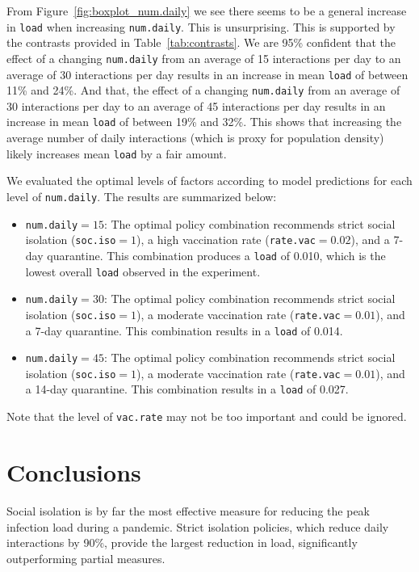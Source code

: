\documentclass[12pt,a4paper]{article}
\begin{document}
From Figure~\ref{fig:boxplot_num.daily} we see there seems to be a general increase in \verb`load` when increasing  \verb`num.daily`. This is unsurprising. This is supported by the contrasts provided in Table~\ref{tab:contrasts}. We are 95\% confident that the effect of a changing \verb`num.daily` from an average of 15 interactions per day to an average of 30 interactions per day results in an increase in mean \verb`load` of between 11\% and 24\%. And that, the effect of a changing \verb`num.daily` from an average of 30 interactions per day to an average of 45 interactions per day results in an increase in mean \verb`load` of between 19\% and 32\%. This shows that increasing the average number of daily interactions (which is proxy for population density) likely increases mean \verb`load` by a fair amount.

We evaluated the optimal levels of factors according to model predictions for each level of \verb`num.daily`. The results are summarized below:
\begin{itemize}
	\item \verb`num.daily`$=15$: The optimal policy combination recommends strict social isolation (\verb'soc.iso'$=1$), a high vaccination rate (\verb'rate.vac'$=0.02$), and a 7-day quarantine. This combination produces a \verb`load` of 0.010, which is the lowest overall \verb`load` observed in the experiment.
	\item \verb`num.daily`$=30$: The optimal policy combination recommends strict social isolation (\verb`soc.iso`$=1$), a moderate vaccination rate (\verb`rate.vac`$= 0.01$), and a 7-day quarantine. This combination results in a \verb`load` of 0.014.
	\item \verb`num.daily`$= 45$: The optimal policy combination recommends strict social isolation (\verb`soc.iso`$= 1$), a moderate vaccination rate (\verb`rate.vac`$=0.01$), and a 14-day quarantine. This combination results in a \verb`load` of 0.027.
\end{itemize}
Note that the level of \verb`vac.rate` may not be too important and could be ignored.



\section{Conclusions}\label{section4}
Social isolation is by far the most effective measure for reducing the peak infection load during a pandemic. Strict isolation policies, which reduce daily interactions by 90\%, provide the largest reduction in load, significantly outperforming partial measures. 
\end{document}
